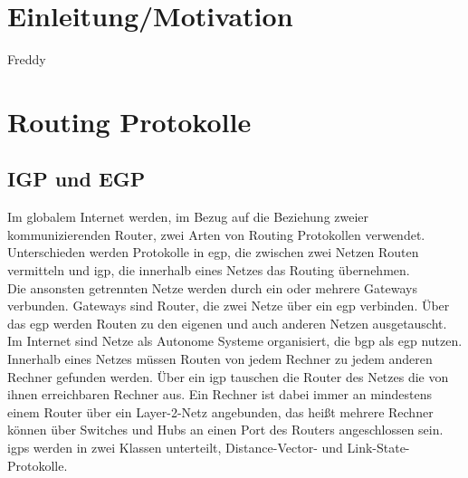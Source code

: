 \documentclass[1pt,a4paper,final]{article}
\begin{document}
\section{Einleitung/Motivation}
Freddy



\section{Routing Protokolle}
\subsection{IGP und EGP}
Im globalem Internet werden, im Bezug auf die Beziehung zweier kommunizierenden Router, zwei Arten von Routing Protokollen verwendet. Unterschieden werden Protokolle in \ac{egp}, die zwischen zwei Netzen Routen vermitteln und \ac{igp}, die innerhalb eines Netzes das Routing übernehmen. \\
Die ansonsten getrennten Netze werden durch ein oder mehrere Gateways verbunden. Gateways sind Router, die zwei Netze über ein \ac{egp} verbinden. Über das \ac{egp} werden Routen zu den eigenen und auch anderen Netzen ausgetauscht. Im Internet sind Netze als Autonome Systeme organisiert, die \ac{bgp} als \ac{egp} nutzen.\\
Innerhalb eines Netzes müssen Routen von jedem Rechner zu jedem anderen Rechner gefunden werden. Über ein \ac{igp} tauschen die Router des Netzes die von ihnen erreichbaren Rechner aus.
Ein Rechner ist dabei immer an mindestens einem Router über ein Layer-2-Netz angebunden, das heißt mehrere Rechner können über Switches und Hubs an einen Port des Routers angeschlossen sein. \\
\ac{igp}s werden in zwei Klassen unterteilt, Distance-Vector- und Link-State-Protokolle.
\end{document}
